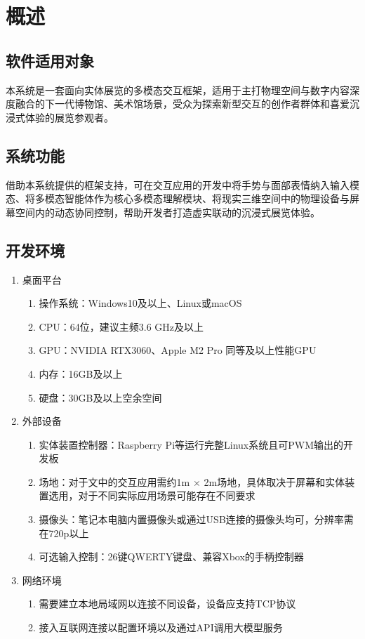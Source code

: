 \documentclass[bachelor]{njupthesis}
\begin{document}
\section{概述}

\subsection{软件适用对象}

本系统是一套面向实体展览的多模态交互框架，适用于主打物理空间与数字内容深度融合的下一代博物馆、美术馆场景，受众为探索新型交互的创作者群体和喜爱沉浸式体验的展览参观者。

\subsection{系统功能}

借助本系统提供的框架支持，可在交互应用的开发中将手势与面部表情纳入输入模态、将多模态智能体作为核心多模态理解模块、将现实三维空间中的物理设备与屏幕空间内的动态协同控制，帮助开发者打造虚实联动的沉浸式展览体验。

\subsection{开发环境}

\begin{enumerate}
\item 桌面平台
  \begin{enumerate}[label=(\alph*)]
  \item 操作系统：Windows10及以上、Linux或macOS
  \item CPU：64位，建议主频3.6 GHz及以上
  \item GPU：NVIDIA RTX3060、Apple M2 Pro 同等及以上性能GPU
  \item 内存：16GB及以上
  \item 硬盘：30GB及以上空余空间
  \end{enumerate}
\item 外部设备
  \begin{enumerate}[label=(\alph*)]
  \item 实体装置控制器：Raspberry Pi等运行完整Linux系统且可PWM输出的开发板
  \item 场地：对于文中的交互应用需约1m $\times$ 2m场地，具体取决于屏幕和实体装置选用，对于不同实际应用场景可能存在不同要求
  \item 摄像头：笔记本电脑内置摄像头或通过USB连接的摄像头均可，分辨率需在720p以上
  \item 可选输入控制：26键QWERTY键盘、兼容Xbox的手柄控制器
  \end{enumerate}
\item 网络环境
  \begin{enumerate}[label=(\alph*)]
  \item 需要建立本地局域网以连接不同设备，设备应支持TCP协议
  \item 接入互联网连接以配置环境以及通过API调用大模型服务
  \end{enumerate}
\end{enumerate}
\end{document}
